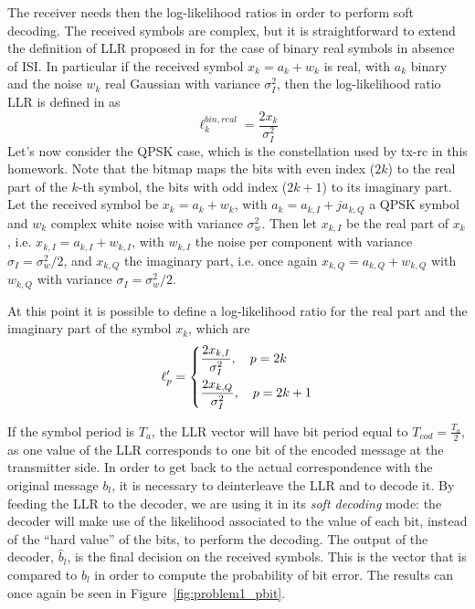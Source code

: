 \documentclass[10pt]{article}
\begin{document}
The receiver needs then the log-likelihood ratios in order to perform soft decoding. The received symbols are complex, but it is straightforward to extend the definition of LLR proposed in \cite{bc} for the case of binary real symbols in absence of ISI. In particular if the received symbol $x_k = a_k + w_k$ is real, with $a_k$ binary and the noise $w_k$ real Gaussian with variance $\sigma_I^2$, then the log-likelihood ratio LLR is defined in \cite{bc} as 
\begin{equation}
	\ell_k^{bin, real} = \frac{2 x_k}{\sigma_I^2}
\end{equation}
Let's now consider the QPSK case, which is the constellation used by tx-rc in this homework. Note that the bitmap maps the bits with even index ($2k$) to the real part of the $k$-th symbol, the bits with odd index ($2k + 1$) to its imaginary part. Let the received symbol be $x_k = a_k + w_k$, with $a_k = a_{k, I} + j a_{k, Q}$ a QPSK symbol and $w_k$ complex white noise with variance $\sigma_w^2$. Then let $x_{k,I}$ be the real part of $x_k$, i.e. $x_{k,I} = a_{k, I} + w_{k, I}$, with $w_{k,I}$ the noise per component with variance $\sigma_I = \sigma_w^2/2$, and $x_{k, Q}$ the imaginary part, i.e. once again $x_{k,Q} = a_{k, Q} + w_{k, Q}$ with $w_{k, Q}$ with variance $\sigma_I = \sigma_w^2/2$. 

At this point it is possible to define a log-likelihood ratio for the real part and the imaginary part of the symbol $x_k$, which are
\begin{equation}
	\ell'_p =
	\begin{dcases}
	\frac{2 x_{k,I}}{\sigma_I^2}, \quad p = 2k \\
	\frac{2 x_{k,Q}}{\sigma_I^2}, \quad p = 2k +1
	\end{dcases}
\end{equation}


If the symbol period is $T_a$, the LLR vector will have bit period equal to $T_{cod} = \frac{T_a}{2}$, as one value of the LLR corresponds to one bit of the encoded message at the transmitter side. In order to get back to the actual correspondence with the original message $b_l$, it is necessary to deinterleave the LLR and to decode it. By feeding the LLR to the decoder, we are using it in its \emph{soft decoding} mode: the decoder will make use of the likelihood associated to the value of each bit, instead of the ``hard value'' of the bits, to perform the decoding. %
The output of the decoder, $\hat{b}_l$, is the final decision on the received symbols. This is the vector that is compared to $b_l$ in order to compute the probability of bit error. The results can once again be seen in Figure~\ref{fig:problem1_pbit}. 
\end{document}
